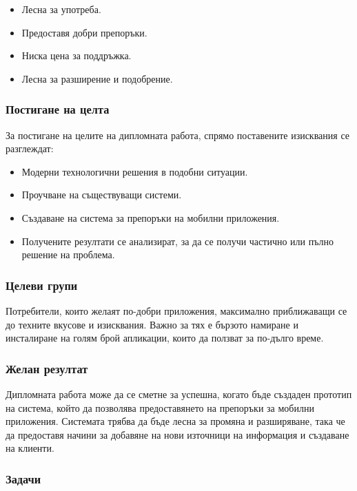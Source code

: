 		\begin{itemize}
			\item Лесна за употреба.
			\item Предоставя добри препоръки.
			\item Ниска цена за поддръжка.
			\item Лесна за разширение и подобрение.
		\end{itemize}

	\subsubsection{Постигане на целта}

		За постигане на целите на дипломната работа, спрямо поставените изисквания се разглеждат:
		
		\begin{itemize}
			\item Модерни технологични решения в подобни ситуации.
			\item Проучване на съществуващи системи.
			\item Създаване на система за препоръки на мобилни приложения.
			\item Получените резултати се анализират, за да се получи частично или пълно решение на проблема.
		\end{itemize}

	\subsubsection{Целеви групи}
	
		Потребители, които желаят по-добри приложения, максимално приближаващи се до техните вкусове и изисквания. Важно за тях е бързото намиране и инсталиране на голям брой апликации, които да ползват за по-дълго време.
	
	\subsubsection{Желан резултат}
	
		Дипломната работа може да се сметне за успешна, когато бъде създаден прототип на система, който да позволява 
		предоставянето на препоръки за мобилни приложения. Системата трябва да бъде лесна за промяна и разширяване,
		така че да предоставя начини за добавяне на нови източници на информация и създаване на клиенти.
	
	\subsubsection{Задачи}
		

